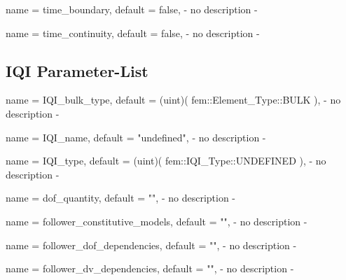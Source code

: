 \begin{parameter}{
    name    = {time_boundary},
    default = {false},
}
- no description -
\end{parameter}

\begin{parameter}{
    name    = {time_continuity},
    default = {false},
}
- no description -
\end{parameter}

\subsection{IQI Parameter-List}

\begin{parameter}{
    name    = {IQI_bulk_type},
    default = {(uint)( fem::Element_Type::BULK )},
}
- no description -
\end{parameter}

\begin{parameter}{
    name    = {IQI_name},
    default = {"undefined"},
}
- no description -
\end{parameter}

\begin{parameter}{
    name    = {IQI_type},
    default = {(uint)( fem::IQI_Type::UNDEFINED )},
}
- no description -
\end{parameter}

\begin{parameter}{
    name    = {dof_quantity},
    default = {""},
}
- no description -
\end{parameter}

\begin{parameter}{
    name    = {follower_constitutive_models},
    default = {""},
}
- no description -
\end{parameter}

\begin{parameter}{
    name    = {follower_dof_dependencies},
    default = {""},
}
- no description -
\end{parameter}

\begin{parameter}{
    name    = {follower_dv_dependencies},
    default = {""},
}
- no description -
\end{parameter}

